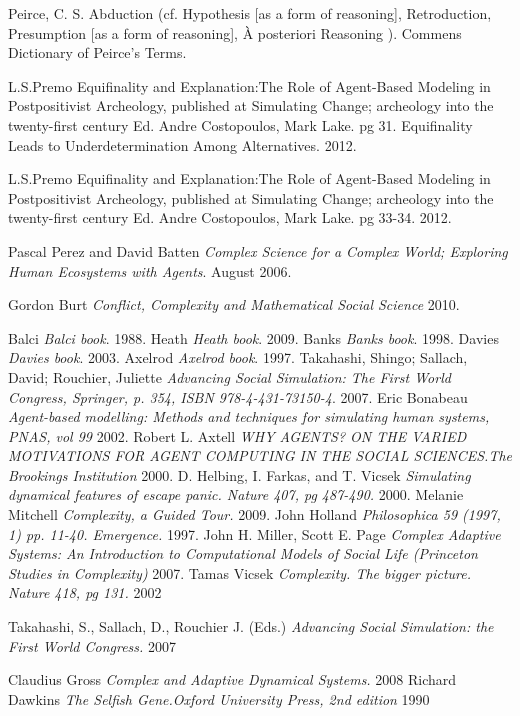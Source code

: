 \documentclass[11pt,oneside,a4paper,openright]{report}
\begin{document}
\begin{thebibliography}{13}
	Peirce, C. S. 
	Abduction (cf. Hypothesis [as a form of reasoning], Retroduction, Presumption [as a form of reasoning], À posteriori Reasoning ). Commens Dictionary of Peirce's Terms.
	

	L.S.Premo
	Equifinality and Explanation:The Role of Agent-Based Modeling in Postpositivist Archeology, published at Simulating Change; archeology into the twenty-first century Ed. Andre Costopoulos, Mark Lake. pg 31. Equifinality Leads to Underdetermination Among Alternatives.
	2012.

	L.S.Premo
	Equifinality and Explanation:The Role of Agent-Based Modeling in Postpositivist Archeology, published at Simulating Change; archeology into the twenty-first century Ed. Andre Costopoulos, Mark Lake. pg 33-34.
	2012.


	Pascal Perez and David Batten
	\emph{Complex Science for a Complex World; Exploring Human Ecosystems with Agents}. 
	August 2006.

	Gordon Burt
	\emph{Conflict, Complexity and Mathematical Social Science}
	2010.

	Balci
	\emph{Balci book}.
	1988.
	Heath
	\emph{Heath book}.
	2009.
	Banks
	\emph{Banks book}.
	1998.
	Davies
	\emph{Davies book}.
	2003.
	Axelrod
	\emph{Axelrod book}.
	1997.
	Takahashi, Shingo; Sallach, David; Rouchier, Juliette
	\emph{Advancing Social Simulation: The First World Congress, Springer, p. 354, ISBN 978-4-431-73150-4}.
	2007.
	Eric Bonabeau
	\emph{Agent-based modelling: Methods and techniques for simulating human systems, PNAS, vol 99} 
	2002.
	Robert L. Axtell
	\emph{WHY AGENTS? ON THE VARIED MOTIVATIONS FOR AGENT COMPUTING IN THE SOCIAL SCIENCES.The Brookings Institution}
	2000.
	D. Helbing, I. Farkas, and T. Vicsek 
	\emph{Simulating dynamical features of escape panic. Nature 407, pg 487-490.}
	2000.
	Melanie Mitchell
	\emph{Complexity, a Guided Tour.}
	2009.
	John Holland
	\emph{Philosophica 59 (1997, 1) pp. 11-40. Emergence.}
	1997.
	John H. Miller, Scott E. Page
	\emph{Complex Adaptive Systems: An Introduction to Computational Models of Social Life (Princeton Studies in Complexity)}
	2007.
	Tamas Vicsek
	\emph{Complexity. The bigger picture. Nature 418, pg 131.}
	2002	

	Takahashi, S., Sallach, D., Rouchier J. (Eds.)
	\emph{Advancing Social Simulation: the First World Congress.}
	2007	

	Claudius Gross
	\emph{Complex and Adaptive Dynamical Systems.}
	2008	
	Richard Dawkins
	\emph{The Selfish Gene.Oxford University Press, 2nd edition}	
	1990

\end{thebibliography}
\end{document}
